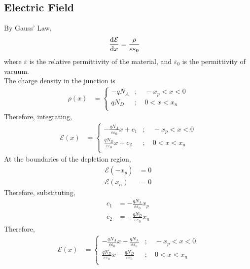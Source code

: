 \documentclass[titlepage, fleqn, a4paper, 12pt, twoside]{article}
\theoremstyle{definition}
\theoremstyle{theorem}
\begin{document}
\subsection{Electric Field}

By Gauss' Law,
\begin{align*}
	\dod{\mathcal{E}}{x} & = \frac{\rho}{\varepsilon \varepsilon_0}
\end{align*}
where $\varepsilon$ is the relative permittivity of the material, and $\varepsilon_0$ is the permittivity of vacuum.\\
The charge density in the junction is
\begin{align*}
	\rho(x) &=
		\begin{cases}
			-q N_A & ;\quad -x_p < x < 0 \\
			q N_D  & ;\quad 0 < x < x_n  \\
		\end{cases}
\end{align*}
Therefore, integrating,
\begin{align*}
	\mathcal{E}(x) &=
		\begin{cases}
			-\frac{q N_A}{\varepsilon \varepsilon_0} x + c_1 & ;\quad -x_p < x < 0 \\
			\frac{q N_D}{\varepsilon \varepsilon_0} x + c_2  & ;\quad 0 < x < x_n  \\
		\end{cases}
\end{align*}
At the boundaries of the depletion region,
\begin{align*}
	\mathcal{E}(-x_p) & = 0 \\
	\mathcal{E}(x_n)  & = 0
\end{align*}
Therefore, substituting,
\begin{align*}
	c_1 & = -\frac{q N_A}{\varepsilon \varepsilon_0} x_p \\
	c_2 & = -\frac{q N_D}{\varepsilon \varepsilon_0} x_n
\end{align*}
Therefore,
\begin{align*}
	\mathcal{E}(x) &=
		\begin{cases}
			-\frac{q N_A}{\varepsilon \varepsilon_0} x - \frac{q N_A}{\varepsilon \varepsilon_0} & ;\quad -x_p < x < 0 \\
			\frac{q N_D}{\varepsilon \varepsilon_0} x - \frac{q N_D}{\varepsilon \varepsilon_0}  & ;\quad 0 < x < x_n  \\
		\end{cases}
\end{align*}
\end{document}
